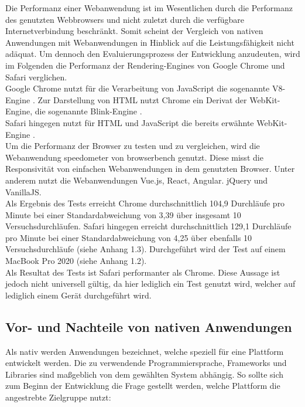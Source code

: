 \documentclass[a4paper]{scrartcl}
\begin{document}
Die Performanz einer Webanwendung ist im Wesentlichen durch die Performanz des genutzten Webbrowsers und nicht zuletzt durch die verfügbare Internetverbindung beschränkt. Somit scheint der Vergleich von nativen Anwendungen mit Webanwendungen in Hinblick auf die Leistungsfähigkeit nicht adäquat. Um dennoch den Evaluierungsprozess der Entwicklung anzudeuten, wird im Folgenden die Performanz der Rendering-Engines von Google Chrome und Safari verglichen. \\ 
Google Chrome nutzt für die Verarbeitung von JavaScript die sogenannte V8-Engine \autocite{v8_Engine}. Zur Darstellung von HTML nutzt Chrome ein Derivat der WebKit-Engine, die sogenannte Blink-Engine \autocite{Blink_Rendering}. \\
Safari hingegen nutzt für HTML und JavaScript die bereits erwähnte WebKit-Engine \autocite{WebKit}. \\
Um die Performanz der Browser zu testen und zu vergleichen, wird die Webanwendung speedometer von browserbench genutzt. Diese misst die Responsivität von einfachen Webanwendungen in dem genutzten Browser. Unter anderem nutzt die Webanwendungen Vue.js, React, Angular. jQuery und VanillaJS. \\
Als Ergebnis des Tests erreicht Chrome durchschnittlich 104,9 Durchläufe pro Minute bei einer Standardabweichung von 3,39 über insgesamt 10 Versuchsdurchläufen. Safari hingegen erreicht durchschnittlich 129,1 Durchläufe pro Minute bei einer Standardabweichung von 4,25 über ebenfalls 10 Versuchsdurchläufe (siehe Anhang 1.3). Durchgeführt wird der Test auf einem MacBook Pro 2020 (siehe Anhang 1.2). \\
Als Resultat des Tests ist Safari performanter als Chrome. Diese Aussage ist jedoch nicht universell gültig, da hier lediglich ein Test genutzt wird, welcher auf lediglich einem Gerät durchgeführt wird. \\

\newpage

\subsection{Vor- und Nachteile von nativen Anwendungen}

Als nativ werden Anwendungen bezeichnet, welche speziell für eine Plattform entwickelt werden. Die zu verwendende Programmiersprache, Frameworks und Libraries sind maßgeblich von dem gewählten System abhängig. So sollte sich zum Beginn der Entwicklung die Frage gestellt werden, welche Plattform die angestrebte Zielgruppe nutzt:
\end{document}
